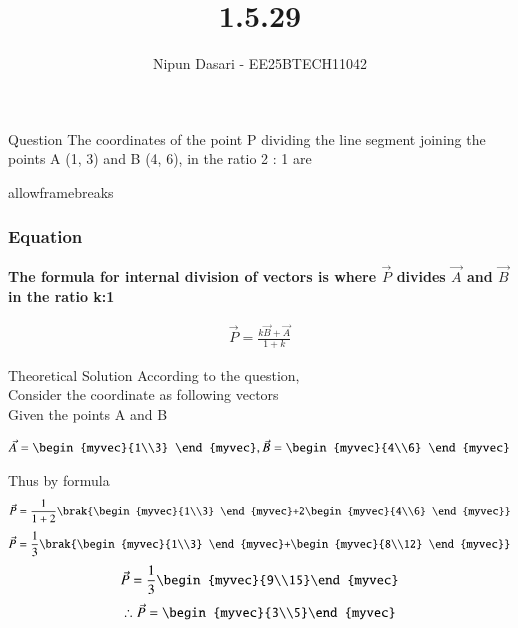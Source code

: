 \documentclass{beamer}
\title %
{1.5.29}
\author %
{Nipun Dasari - EE25BTECH11042}
\begin{document}
	
	
	\frame{\titlepage}
	\begin{frame}{Question}
		The coordinates of the point P dividing the line segment joining the points A (1, 3)
		and B (4, 6), in the ratio 2 : 1 are
	\end{frame}
	\begin{frame}{allowframebreaks}
		\frametitle{Equation}
	\textbf{The formula for internal division of vectors is where $\vec{P}$ divides $\vec{A}$ and $\vec{B}$ in the ratio k:1}
		\centering
		
		\label{tab:parameters}
		\begin{align*}

		
			\vec{P} =	\frac{k\vec{B}+\vec{A}}{1+k} 
		
		\end{align*}
		
	\end{frame}
	
	
	\begin{frame}{Theoretical Solution}
	According to the question, \\
Consider the coordinate as following vectors \\ 

Given the points A and B

\begin{align*}
	\vec{A} = \begin{myvec}{1\\3} \end{myvec} , \vec{B} = \begin{myvec}{4\\6} \end{myvec}
\end{align*}

Thus by formula
\begin{align*}
	\vec{P} = \frac{1}{1+2}\brak{\begin{myvec}{1\\3} \end{myvec}+2\begin{myvec}{4\\6} \end{myvec}}
\end{align*}
\begin{align*}
	\vec{P} = \frac{1}{3}\brak{\begin{myvec}{1\\3} \end{myvec}+\begin{myvec}{8\\12} \end{myvec}}
\end{align*}
\begin{align*}
	\vec{P} = \frac{1}{3}\begin{myvec}{9\\15}\end{myvec}
\end{align*}
\begin{align*}
	\therefore	\vec{P} = \begin{myvec}{3\\5}\end{myvec}
\end{align*}
\end{frame}
	
\end{document}
